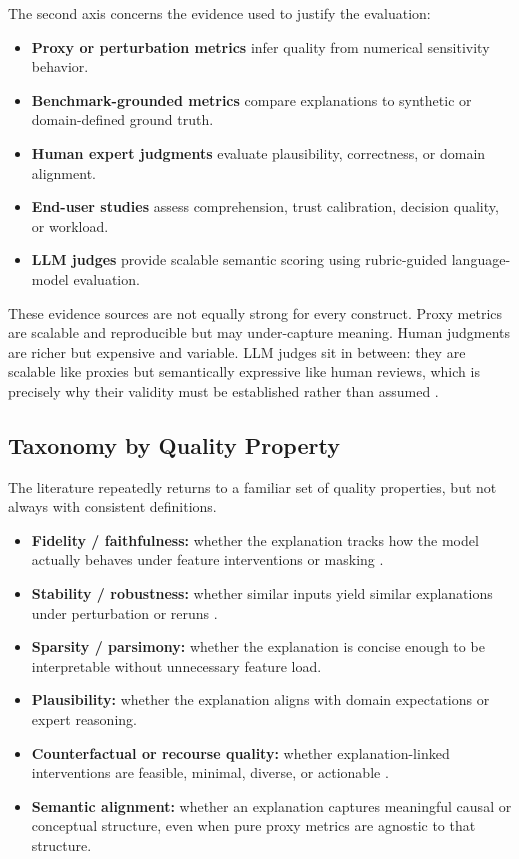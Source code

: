\documentclass[twoside,11pt]{article}
\begin{document}
The second axis concerns the evidence used to justify the evaluation:
\begin{itemize}[leftmargin=*]
\item \textbf{Proxy or perturbation metrics} infer quality from
numerical sensitivity behavior.
\item \textbf{Benchmark-grounded metrics} compare explanations to
synthetic or domain-defined ground truth.
\item \textbf{Human expert judgments} evaluate plausibility,
correctness, or domain alignment.
\item \textbf{End-user studies} assess comprehension, trust
calibration, decision quality, or workload.
\item \textbf{LLM judges} provide scalable semantic scoring using
rubric-guided language-model evaluation.
\end{itemize}

These evidence sources are not equally strong for every construct.
Proxy metrics are scalable and reproducible but may under-capture
meaning. Human judgments are richer but expensive and variable. LLM
judges sit in between: they are scalable like proxies but semantically
expressive like human reviews, which is precisely why their validity
must be established rather than assumed
\citep{gu2024llmjudge,wu2025userperceptions,zhou2025medthink}.

\subsection{Taxonomy by Quality Property}

The literature repeatedly returns to a familiar set of quality
properties, but not always with consistent definitions.
\begin{itemize}[leftmargin=*]
\item \textbf{Fidelity / faithfulness:} whether the explanation tracks
how the model actually behaves under feature interventions or masking
\citep{ribeiro2016why,lundberg2017unified,zheng2025ffidelity}.
\item \textbf{Stability / robustness:} whether similar inputs yield
similar explanations under perturbation or reruns
\citep{pawlicki2024multiple,canha2025functionally}.
\item \textbf{Sparsity / parsimony:} whether the explanation is concise
enough to be interpretable without unnecessary feature load.
\item \textbf{Plausibility:} whether the explanation aligns with domain
expectations or expert reasoning.
\item \textbf{Counterfactual or recourse quality:} whether
explanation-linked interventions are feasible, minimal, diverse, or
actionable \citep{mothilal2020dice}.
\item \textbf{Semantic alignment:} whether an explanation captures
meaningful causal or conceptual structure, even when pure proxy metrics
are agnostic to that structure.
\end{itemize}
\end{document}
